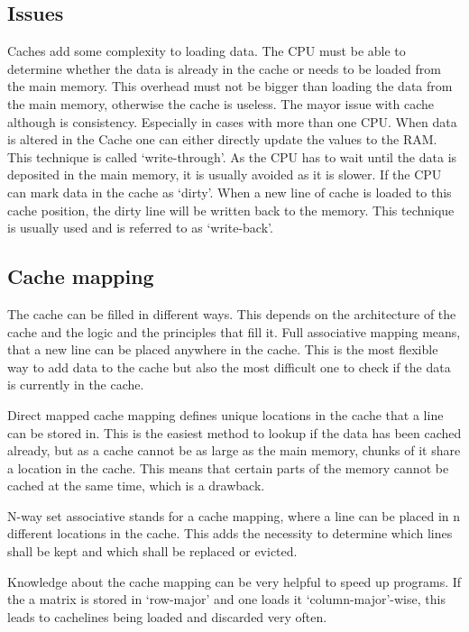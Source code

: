 \documentclass{article}
\begin{document}
\subsection{Issues} %
\label{sub:issues}
	Caches add some complexity to loading data.
	The CPU must be able to determine whether the data is already in the cache
	or needs to be loaded from the main memory.
	This overhead must not be bigger than loading the data from the main memory,
	otherwise the cache is useless.
	The mayor issue with cache although is consistency.
	Especially in cases with more than one CPU.
	When data is altered in the Cache one can either directly update the values to the RAM.
	This technique is called ‘write-through’.
	As the CPU has to wait until the data is deposited in the main memory,
	it is usually avoided as it is slower.
	If the CPU can mark data in the cache as ‘dirty’.
	When a new line of cache is loaded to this cache position,
	the dirty line will be written back to the memory.
	This technique is usually used and is referred to as ‘write-back’.

\subsection{Cache mapping} %
\label{sub:cache_mapping}
	The cache can be filled in different ways.
	This depends on the architecture of the cache
	and the logic and the principles that fill it.
	Full associative mapping means,
	that a new line can be placed anywhere in the cache.
	This is the most flexible way to add data to the cache
	but also the most difficult one to check if the data is currently in the cache.

	Direct mapped cache mapping defines unique locations in the cache that a line can be stored in. This is the easiest method to lookup if the data has been cached already,
	but as a cache cannot be as large as the main memory,
	chunks of it share a location in the cache.
	This means that certain parts of the memory cannot be cached at the same time,
	which is a drawback.

	N-way set associative stands for a cache mapping,
	where a line can be placed in n different locations in the cache.
	This adds the necessity to determine which lines shall be kept
	and which shall be replaced or evicted.

	Knowledge about the cache mapping can be very helpful to speed up programs.
	If the a matrix is stored in ‘row-major’
	and one loads it ‘column-major’-wise,
	this leads to cachelines being loaded and discarded very often.
\end{document}
